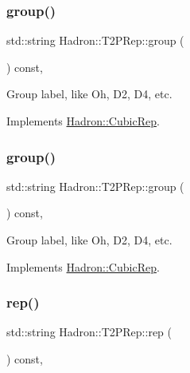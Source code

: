 \subsubsection{\texorpdfstring{group()}{group()}\hspace{0.1cm}{\footnotesize\ttfamily [1/2]}}
{\footnotesize\ttfamily std\+::string Hadron\+::\+T2\+P\+Rep\+::group (\begin{DoxyParamCaption}{ }\end{DoxyParamCaption}) const\hspace{0.3cm}{\ttfamily [inline]}, {\ttfamily [virtual]}}

Group label, like Oh, D2, D4, etc. 

Implements \mbox{\hyperlink{structHadron_1_1CubicRep_a0748f11ec87f387062c8e8981339a29c}{Hadron\+::\+Cubic\+Rep}}.

\mbox{\label{structHadron_1_1T2PRep_af477032faaa8fb25f13f9e962dd68437}} 
\subsubsection{\texorpdfstring{group()}{group()}\hspace{0.1cm}{\footnotesize\ttfamily [2/2]}}
{\footnotesize\ttfamily std\+::string Hadron\+::\+T2\+P\+Rep\+::group (\begin{DoxyParamCaption}{ }\end{DoxyParamCaption}) const\hspace{0.3cm}{\ttfamily [inline]}, {\ttfamily [virtual]}}

Group label, like Oh, D2, D4, etc. 

Implements \mbox{\hyperlink{structHadron_1_1CubicRep_a0748f11ec87f387062c8e8981339a29c}{Hadron\+::\+Cubic\+Rep}}.

\mbox{\label{structHadron_1_1T2PRep_a34a7ab2061f6a666c64ba2b44e0f203d}} 
\subsubsection{\texorpdfstring{rep()}{rep()}\hspace{0.1cm}{\footnotesize\ttfamily [1/2]}}
{\footnotesize\ttfamily std\+::string Hadron\+::\+T2\+P\+Rep\+::rep (\begin{DoxyParamCaption}{ }\end{DoxyParamCaption}) const\hspace{0.3cm}{\ttfamily [inline]}, {\ttfamily [virtual]}}


